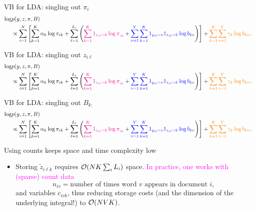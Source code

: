 \documentclass[10pt]{beamer}
\newcommand\un[1]{\textcolor{magenta}{#1}}
\newcommand\unn[1]{\textcolor{blue}{#1}}
\newcommand\unnnn[1]{\textcolor{orange}{#1}}
\def\blank{\vspace{.5\textheight}}
\begin{document}
\begin{frame}{VB for LDA: singling out $\pi_i$}
  \fontsize{6pt}{7pt}\selectfont
\begin{align*}
\log &p(y, z, \pi, B)\\
     & \propto \sum_{i=1}^N \left[\sum_{k=1}^K \alpha_k \log \pi_{ik} + \sum_{\ell=1}^{L_i} \left(\un{\sum_{k=1}^K 1_{z_{i\ell}=k}\log\pi_{_{ik}}} + \unn{\sum_{v=1}^V \sum_{k=1}^K 1_{y_{i\ell}=v}1_{z_{i\ell}=k} \log b_{kv}}\right)\right] 
    + \unnnn{\sum_{k=1}^K \sum_{v=1}^V \gamma_k\log b_{kv}}.
\end{align*}
\vfill
\blank
\end{frame}

\begin{frame}{VB for LDA: singling out $z_{i\ell}$}
  \fontsize{6pt}{7pt}\selectfont
\begin{align*}
\log &p(y, z, \pi, B)\\
     & \propto \sum_{i=1}^N \left[\sum_{k=1}^K \alpha_k \log \pi_{ik} + \sum_{\ell=1}^{L_i} \left(\un{\sum_{k=1}^K 1_{z_{i\ell}=k}\log\pi_{_{ik}}} + \unn{\sum_{v=1}^V \sum_{k=1}^K 1_{y_{i\ell}=v}1_{z_{i\ell}=k} \log b_{kv}}\right)\right] 
    + \unnnn{\sum_{k=1}^K \sum_{v=1}^V \gamma_k\log b_{kv}}.
\end{align*}
  \vfill
  \blank
\end{frame}

\begin{frame}{VB for LDA: singling out $B_{k:}$}
  \fontsize{6pt}{7pt}\selectfont
\begin{align*}
\log &p(y, z, \pi, B)\\
     & \propto \sum_{i=1}^N \left[\sum_{k=1}^K \alpha_k \log \pi_{ik} + \sum_{\ell=1}^{L_i} \left(\un{\sum_{k=1}^K 1_{z_{i\ell}=k}\log\pi_{_{ik}}} + \unn{\sum_{v=1}^V \sum_{k=1}^K 1_{y_{i\ell}=v}1_{z_{i\ell}=k} \log b_{kv}}\right)\right] 
    + \unnnn{\sum_{k=1}^K \sum_{v=1}^V \gamma_k\log b_{kv}}.
  \end{align*}
  \vfill
  \blank
\end{frame}


\begin{frame}{Using counts keeps space and time complexity low}
\begin{itemize}
  \item Storing $\tilde z_{i\ell k}$ requires $\mathcal{O} (N K\sum_i L_i )$ space. \un{In practice, one works with (sparse) count data}
  $$
  n_{iv} = \text{number of times word $v$ appears in document $i$},
  $$
  and variables $c_{ivk}$, thus reducing storage costs (and the dimension of the underlying integral!) to $\mathcal{O}(NVK)$.
\blank
\end{itemize}
\end{frame}
\end{document}
